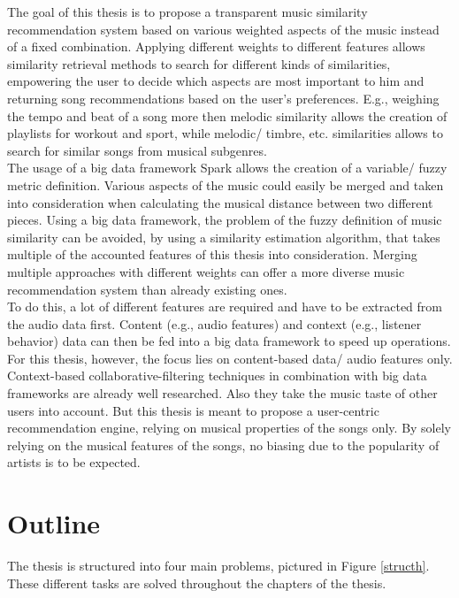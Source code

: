 The goal of this thesis is to propose a transparent music similarity recommendation system based on various weighted aspects of the music instead of a fixed combination. Applying different weights to different features allows similarity retrieval methods to search for different kinds of similarities, empowering the user to decide which aspects are most important to him and returning song recommendations based on the user's preferences. E.g., weighing the tempo and beat of a song more then melodic similarity allows the creation of playlists for workout and sport, while melodic/ timbre, etc. similarities allows to search for similar songs from musical subgenres.\\ 
The usage of a big data framework Spark allows the creation of a variable/ fuzzy metric definition. Various aspects of the music could easily be merged and taken into consideration when calculating the musical distance between two different pieces. Using a big data framework, the problem of the fuzzy definition of music similarity can be avoided, by using a similarity estimation algorithm, that takes multiple of the accounted features of this thesis into consideration. Merging multiple approaches with different weights can offer a more diverse music recommendation system than already existing ones.\\ 
To do this, a lot of different features are required and have to be extracted from the audio data first. Content (e.g., audio features) and context (e.g., listener behavior) data can then be fed into a big data framework to speed up operations. For this thesis, however, the focus lies on content-based data/ audio features only.\\ 
Context-based collaborative-filtering techniques in combination with big data frameworks are already well researched. Also they take the music taste of other users into account. But this thesis is meant to propose a user-centric recommendation engine, relying on musical properties of the songs only. By solely relying on the musical features of the songs, no biasing due to the popularity of artists is to be expected.\\

\section{Outline}

\noindent The thesis is structured into four main problems, pictured in Figure \ref{structh}. These different tasks are solved throughout the chapters of the thesis.

